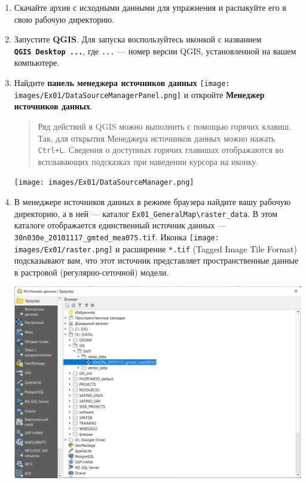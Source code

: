 \documentclass[
  12pt,
]{book}
\begin{document}
\begin{enumerate}
\def\labelenumi{\arabic{enumi}.}
\item
  Скачайте архив с исходными данными для упражнения и распакуйте его в свою рабочую директорию.
\item
  Запустите \textbf{QGIS}. Для запуска воспользуйтесь иконкой с названием \textbf{\texttt{QGIS\ Desktop\ ...}}, где \texttt{...} --- номер версии QGIS, установленной на вашем компьютере.
\item
  Найдите \textbf{панель менеджера источников данных} \texttt{[image: images/Ex01/DataSourceManagerPanel.png]} и откройте \textbf{Менеджер источников данных}.

  \begin{quote}
  Ряд действий в QGIS можно выполнить с помощью горячих клавиш. Так, для открытия Менеджера источников данных можно нажать \texttt{Ctrl+L}. Сведения о доступных горячих главишах отображаются во всплывающих подсказках при наведении курсора на иконку.
  \end{quote}

  \texttt{[image: images/Ex01/DataSourceManager.png]}
\item
  В менеджере источников данных в режиме браузера найдите вашу рабочую директорию, а в ней --- каталог \texttt{Ex01\_GeneralMap\textbackslash{}raster\_data}. В этом каталоге отображается единственный источник данных --- \texttt{30n030e\_20101117\_gmted\_mea075.tif}. Иконка \texttt{[image: images/Ex01/raster.png]} и расширение \texttt{*.tif} (Tagged Image Tile Format) подсказывают вам, что этот источник представляет пространственные данные в растровой (регулярно-сеточной) модели.

  \includegraphics{images/Ex01/DataSourceManager_tif.png}


\end{enumerate}
\end{document}
